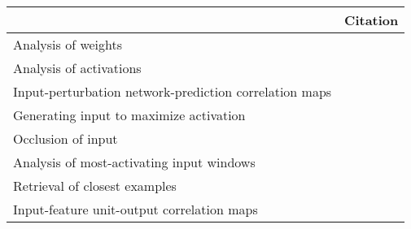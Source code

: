 \begin{tabular}{ll}
\toprule
{} &                                                                                                                                                                                          Citation \\
\midrule
Analysis of weights                                    &  \cite{Perez-Benitez2018, Yoon2018, Langkvist2018, Deiss2018, Lawhern2018, Xu2016, Tsinalis2016a, Nurse2016, Tabar2016a, Zheng2015, Stober2015, Manor2015, Yang2015a, Langkvist2012, Cecotti2011} \\
Analysis of activations                                &                                                                                           \cite{Yuan2018a, Waytowich2018, Lawhern2018, kwak2017, Yin2017a, Supratak2017, Shamwell2016, Manor2015} \\
Input-perturbation network-prediction correlation maps &                                                                                                              \cite{Schirrmeister2017a, Volker2018, Hartmann2018b, Behncke2017, Schirrmeister2017} \\
Generating input to maximize activation                &                                                                                                                                      \cite{VanPutten2018b, Ruffini2018a, Sors2018, Bashivan2016a} \\
Occlusion of input                                     &                                                                                                                                                        \cite{Lee2018, Chambon2018, Thodoroff2016} \\
Analysis of most-activating input windows              &                                                                                                                                                                              \cite{Hartmann2018b} \\
Retrieval of closest examples                          &                                                                                                                                                                                  \cite{Deiss2018} \\
Input-feature unit-output correlation maps             &                                                                                                                                                                          \cite{Schirrmeister2017} \\

\end{tabular}
